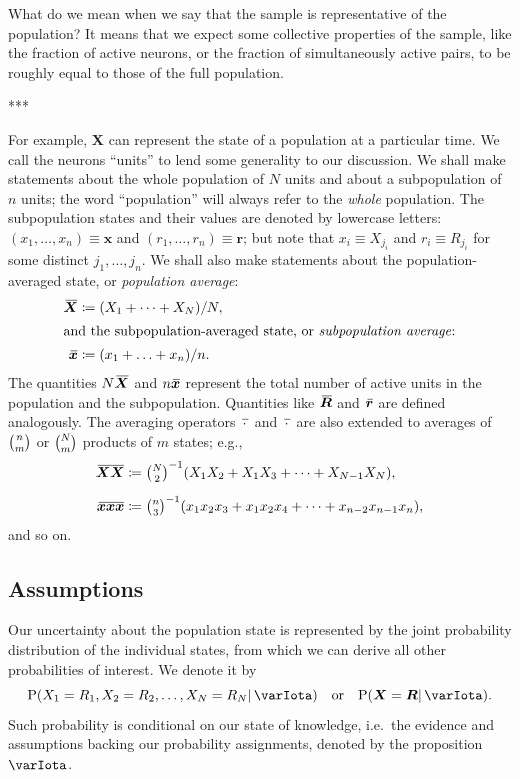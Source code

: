 \documentclass{article}
\theoremstyle{remark}
\theoremstyle{innote}
\newcommand*{\defd}{\coloneqq}
\renewcommand*{\|}{\mathpunct{|}}%
\newcommand*{\dotv}{\mathord{\,\cdot\,}}%
\newcommand*{\p}{\mathrm{P}}%
\newcommand*{\ie}{{i.e.}}
\newcommand*{\eg}{{e.g.}}
\theoremstyle{simple}
\newcommand*{\widebar}[1]{{\mkern1.5mu\skew{2}\overline{\mkern-1.5mu#1\mkern-1.5mu}\mkern 1.5mu}}
\newcommand*{\av}{\widebar} %
\newcommand*{\sav}{\widebar} %
\newcommand*{\yxx}{x}%
\newcommand*{\yx}{\bm{\yxx}}%
\newcommand*{\yxs}{\sav{\yx}}%
\newcommand*{\yX}{\bm{X}}%
\newcommand*{\yXf}{\av{\yX}}%
\newcommand*{\yr}{\bm{r}}%
\newcommand*{\yrs}{\sav{\yr}}%
\newcommand*{\yR}{\bm{R}}%
\newcommand*{\yRf}{\av{\yR}}%
\newcommand*{\yH}{\varIota}
\begin{document}
What do we mean when we say that the sample is representative of the
population? It means that we expect some collective properties of the
sample, like the fraction of active neurons, or the fraction of
simultaneously active pairs, to be roughly equal to those of the full
population.

***

For example, $\yX$ can
represent the state of a population at a particular time. We call the
neurons \enquote{units} to lend some generality to our discussion. We shall
make statements about the whole population of $N$ units and about a
subpopulation of $n$ units; the word \enquote{population} will always refer
to the \emph{whole} population. The subpopulation states and their values
are denoted by lowercase letters: $(x_1, \dotsc, x_n)\equiv\yx$ and
$(r_1, \dotsc, r_n)\equiv\yr$; but note that $x_i \equiv X_{j_i}$ and
$r_i \equiv R_{j_i}$ for some distinct $j_1,\dotsc,j_n$. We shall also make
statements about the population-averaged state, or \emph{population
  average}:
\begin{align}
  \label{eq:population-av}
   \yXf &\defd (X_1 + \dotsb + X_N)/N,
\\
\intertext{and the subpopulation-averaged state, or \emph{subpopulation average}:}
\label{eq:subpopulation-av}
\yxs &\defd (x_1 + \dotsc + x_n)/n.
\end{align}
The quantities $N\yXf$ and $n\yxs$ represent the total number of active
units in the population and the subpopulation. Quantities like $\yRf$ and $\yrs$
are defined analogously. The averaging operators $\sav{\dotv}$ and
$\av{\dotv}$ are also extended to averages of $\tbinom{n}{m}$ or
$\tbinom{N}{m}$ products of $m$ states; \eg,
\begin{align}
\av{\yX \yX} &\defd
\tbinom{N}{2}^{-1} (X_1 X_2 + X_1 X_3  + \dotsb +  X_{N-1} X_N),
\\[2\jot]
\sav{\yx\yx\yx} &\defd
\tbinom{n}{3}^{-1} (x_1 x_2 x_3 + x_1 x_2 x_4 + \dotsb + x_{n-2} x_{n-1} x_n),
\end{align}
and so on.


\subsection{Assumptions}
\label{sec:assumptions}

Our uncertainty about the population state is represented by the joint
probability distribution of the individual states, from which we can
derive all other probabilities of interest. We denote it by
\begin{equation}
  \label{eq:joint_plaus}
  \p(X_1=R_1, X_2=R_2, \dotsc, X_N=R_N \| \yH) \quad\text{or}\quad
\p(\yX =\yR \| \yH).
\end{equation}
Such probability is conditional on our state of knowledge, \ie\ the
evidence and assumptions backing our probability assignments, denoted by
the proposition $\yH$.
\end{document}
